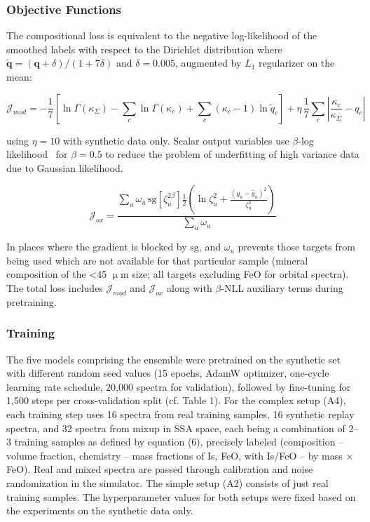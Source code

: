 \documentclass[remotesensing,article,submit,pdftex,moreauthors]{Definitions/mdpi}
\begin{document}
\subsubsection{Objective Functions}

The compositional loss is equivalent to the negative log-likelihood of the smoothed labels with respect to the Dirichlet distribution where $\tilde{\mathbf q} = (\mathbf q + \delta)/(1 + 7\delta)$ and $\delta = 0.005$, augmented by $L_1$ regularizer on the mean:

\begin{equation}
\mathcal J_{mod} = -\frac{1}{7}\left[\ln\Gamma(\kappa_\Sigma) - \sum_c \ln\Gamma(\kappa_c) + \sum_c(\kappa_c-1)\ln\tilde q_c\right] + \eta\,\frac{1}{7}\sum_c\left|\frac{\kappa_c}{\kappa_\Sigma} - q_c\right|
\label{eq7}
\end{equation}

using $\eta = 10$ with synthetic data only. Scalar output variables use $\beta$-log likelihood~\cite{seitzer2022} for $\beta=0.5$ to reduce the problem of underfitting of high variance data due to Gaussian likelihood.

\begin{equation}
\mathcal J_{ox} = \frac{\sum_u \omega_u\,\mathrm{sg}\!\left[\zeta_u^{2\beta}\right]\tfrac12\left(\ln\zeta_u^2 + \frac{(g_u-\hat g_u)^2}{\zeta_u^2}\right)}{\sum_u \omega_u}
\label{eq8}
\end{equation}

In places where the gradient is blocked by $\mathrm{sg}$, and $\omega_u$ prevents those targets from being used which are not available for that particular sample (mineral composition of the <45 $\upmu$m size; all targets excluding FeO for orbital spectra). The total loss includes $\mathcal J_{mod}$ and $\mathcal J_{ox}$ along with $\beta$-NLL auxiliary terms during pretraining.

\subsubsection{Training}

The five models comprising the ensemble were pretrained on the synthetic set with different random seed values (15 epochs, AdamW optimizer, one-cycle learning rate schedule, 20,000 spectra for validation), followed by fine-tuning for 1,500 steps per cross-validation split (cf. Table 1). For the complex setup (A4), each training step uses 16 spectra from real training samples, 16 synthetic replay spectra, and 32 spectra from mixup in SSA space, each being a combination of 2--3 training samples as defined by equation (6), precisely labeled (composition -- volume fraction, chemistry -- mass fractions of Is, FeO, with Is/FeO -- by mass $\times$ FeO). Real and mixed spectra are passed through calibration and noise randomization in the simulator. The simple setup (A2) consists of just real training samples. The hyperparameter values for both setups were fixed based on the experiments on the synthetic data only.
\end{document}
